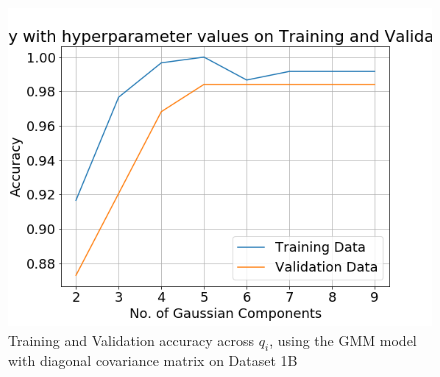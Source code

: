 \documentclass[11pt,a4paper]{article}
\begin{document}
\vspace{-2em}
\begin{figure}[H]
    \centering
    \includegraphics[scale=0.5]{images/1B/acc_1b.png}
    \caption{Training and Validation accuracy across $q_i$, using the GMM model with diagonal covariance matrix on Dataset 1B}
    \label{fig:acc1bGMMdiag}
\end{figure}
\end{document}
